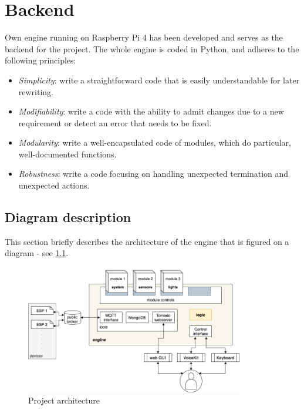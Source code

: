 \chapter{Backend} \label{chap:backend}



Own engine running on Raspberry Pi 4 has been developed and serves as the backend for the project. The whole engine is coded in Python, and adheres to the following principles:
\begin{itemize}
	\item \textit{Simplicity}: write a straightforward code that is easily understandable for later rewriting.
	\item \textit{Modifiability}: write a code with the ability to admit changes due to a new requirement or detect an error that needs to be fixed.
	\item \textit{Modularity}: write a well-encapsulated code of modules, which do particular, well-documented functions.
	\item \textit{Robustness}: write a code focusing on handling unexpected termination and unexpected actions.
\end{itemize}


\section{Diagram description} \label{section:diagram description}

This section briefly describes the architecture of the engine that is figured on a diagram - see  \cref{fig:vh_project_design}.

\begin{figure}[H]
  \centering
  \includegraphics[width=0.85\textwidth]{img/vh_project_design.png}
  \caption{Project architecture}
  \label{fig:vh_project_design}
\end{figure}

